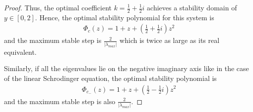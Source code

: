 \documentclass[10pt,a4paper]{amsart}
\begin{document}
\begin{proof}
 
Thus, the optimal coefficient $k =\frac{1}{2}+\frac{1}{2}i$ achieves a stability domain of $y \in [0, 2]$. Hence, the optimal stability polynomial for this system is 
\begin{align}
    \Phi_c(z) = 1 +z + \left(\frac{1}{2}+\frac{1}{2}i\right)z^2
\end{align}
 and the maximum stable step is $\frac{2}{|\lambda_{max}|}$ which is twice as large as its real equivalent.

Similarly, if all the eigenvalues lie on the negative imaginary axis like in the case of the linear Schrodinger equation, the optimal stability polynomial is 
\begin{align}
    \Phi_{c_-}(z) = 1 +z + \left(\frac{1}{2}-\frac{1}{2}i\right)z^2
    \label{eq:stabschro_complex}
\end{align}
and the maximum stable step is also $\frac{2}{|\lambda_{max}|}$.
\end{proof}
\end{document}
